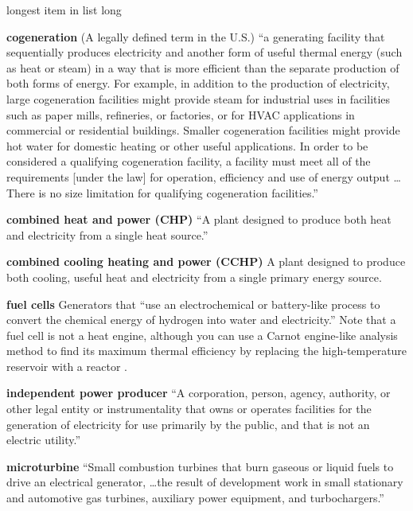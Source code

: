 \documentclass[10pt]{article}
\begin{document}
\begin{labeling}{longest item in list long}

\item [\textbf{cogeneration}] (A legally defined term in the U.S.) ``a generating facility that sequentially produces electricity and another form of useful thermal energy (such as heat or steam) in a way that is more efficient than the separate production of both forms of energy. For example, in addition to the production of electricity, large cogeneration facilities might provide steam for industrial uses in facilities such as paper mills, refineries, or factories, or for HVAC applications in commercial or residential buildings. Smaller cogeneration facilities might provide hot water for domestic heating or other useful applications. In order to be considered a qualifying cogeneration facility, a facility must meet all of the requirements [under the law] for operation, efficiency and use of energy output \ldots There is no size limitation for qualifying cogeneration facilities.'' \cite{PURPAwhatisQF}

\item [\textbf{combined heat and power (CHP)}]  ``A plant designed to produce both heat and electricity from a single heat source.'' \cite{EIAglossary}

\item [\textbf{combined cooling heating and power (CCHP)}] A plant designed to produce both cooling, useful heat and electricity from a single primary energy source.

\item [\textbf{fuel cells}] Generators that ``use an electrochemical or battery-like process to convert the chemical energy of
hydrogen into water and electricity.'' \cite{EIAglossary} Note that a fuel cell is not a heat engine, although you can use a Carnot engine-like analysis method to find its maximum thermal efficiency by replacing the high-temperature reservoir with a reactor \cite{Lutz2002-co}.

\item [\textbf{independent power producer}] ``A corporation, person, agency, authority, or other legal entity or instrumentality that owns or operates facilities for the generation of electricity for use primarily by the public, and that is not an electric utility.'' \cite{EIAglossary}

\item [\textbf{microturbine}]  ``Small combustion turbines that burn gaseous or liquid fuels to
drive an electrical generator, \ldots the result of development work in small stationary and automotive gas
turbines, auxiliary power equipment, and turbochargers.'' \cite{Combined_Heat_and_Power_Partnership2017-rd} 



\end{labeling}
\end{document}
